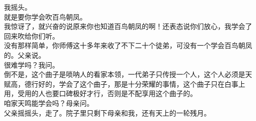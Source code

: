 我摇头。
\\

就是要你学会吹百鸟朝凤。
\\

我惊讶了，就兴奋的说原来你也知道百鸟朝凤的啊！还表态说你们放心，我学会了回来吹给你们听。
\\

没有那样简单，你师傅这十多年来收了不下二十个徒弟，可没有一个学会百鸟朝凤的。父亲说。
\\

很难学吗？我问。
\\

倒不是，这个曲子是唢呐人的看家本领，一代弟子只传授一个人，这个人必须是天赋高，德行好的，学会了这个曲子，那是十分荣耀的事情，这个曲子只在白事上用，受用的人也要口碑极好才行，否则是不配享用这个曲子的。
\\

咱家天鸣能学会吗？母亲问。
\\

父亲摇摇头，走了。院子里只剩下母亲和我，还有天上的一轮残月。\\